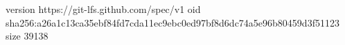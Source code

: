 version https://git-lfs.github.com/spec/v1
oid sha256:a26a1c13ca35ebf84fd7cda11ec9ebc0ed97bf8d6dc74a5e96b80459d3f51123
size 39138
